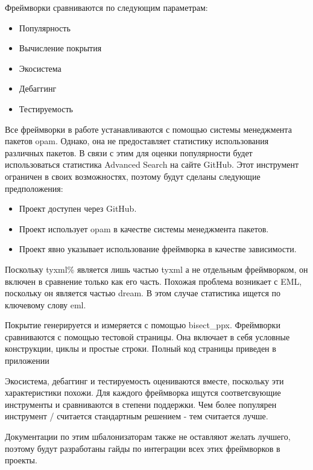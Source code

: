 

Фреймворки сравниваются по следующим параметрам:
\begin{itemize}
    \item Популярность
    \item Вычисление покрытия
    \item Экосистема
    \item Дебаггинг
    \item Тестируемость
\end{itemize}



Все фреймворки в работе устанавливаются с помощью системы менеджмента пакетов opam.
Однако, она не предоставляет статистику использования различных пакетов.
В связи с этим для оценки популярности будет использоваться статистика Advanced Search на сайте GitHub.
Этот инструмент ограничен в своих возможностях, поэтому будут сделаны следующие предположения:
\begin{itemize}
    \item Проект доступен через GitHub.
    \item Проект использует opam в качестве системы менеджмента пакетов.
    \item Проект явно указывает использование фреймворка в качестве зависимости.
\end{itemize}


Поскольку tyxml\% является лишь частью tyxml а не отдельным фреймворком, он включен в сравнение только как его часть.
Похожая проблема возникает с EML, поскольку он является частью dream.
В этом случае статистика ищется по ключевому слову eml.


Покрытие генерируется и измеряется с помощью bisect\_ppx.
Фреймворки сравниваются с помощью тестовой страницы.
Она включает в себя условные конструкции, циклы и простые строки.
Полный код страницы приведен в приложении %

Экосистема, дебаггинг и тестируемость оцениваются вместе, поскольку эти характеристики похожи.
Для каждого фреймворка ищутся соответсвующие инструменты и сравниваются в степени поддержки.
Чем более популярен инструмент / считается стандартным решением - тем считается лучше.

Документации по этим шбалонизаторам также не оставляют желать лучшего, поэтому будут разработаны гайды по интеграции всех этих фреймворков в проекты.

